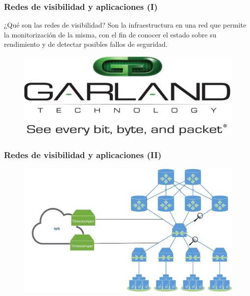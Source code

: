 \documentclass{beamer}
\begin{document}
\begin{frame}
\frametitle{Redes de visibilidad y aplicaciones (I)}
\begin{block}{¿Qué son las redes de visibilidad?}
	Son la infraestructura en una red que permite la monitorización de la misma, con el fin de conocer el estado sobre su rendimiento y de detectar posibles fallos de seguridad.
\end{block}

\begin{figure}[H]
	\centering
	\includegraphics[scale=0.3]{garland3.jpeg}
	\label{garland2}
\end{figure}

\end{frame}


\begin{frame}
\frametitle{Redes de visibilidad y aplicaciones (II)}

\begin{figure}[H]
	\centering
	\includegraphics[scale=0.1]{visibility.jpg}
	\label{visibility}
\end{figure}

\end{frame}
\end{document}
